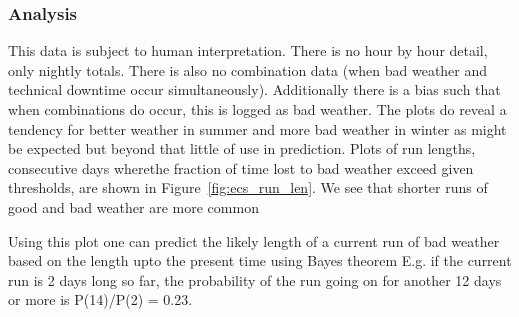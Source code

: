 {{\subsubsection{Analysis}
This data is subject to human interpretation. There is no hour by hour detail, only nightly totals. There is also no combination data (when bad weather and technical downtime occur simultaneously). Additionally there is a bias such that when combinations do occur, this is logged as bad weather. The plots do reveal a tendency for better weather in summer and more bad weather in winter as might be expected but beyond that little of use in prediction. Plots of run lengths, consecutive days wherethe  fraction of time lost to bad weather exceed given thresholds, are shown in Figure~\ref{fig:ecs_run_len}. We see that shorter runs of good and bad weather are more common 

Using this plot one can predict the likely length of a current run of bad weather based on the length upto the present time using Bayes theorem E.g. if the current run is 2 days long so far, the probability of the run going on for another 12 days or more is P(14)/P(2) = 0.23.


}}
